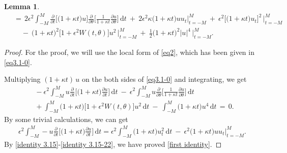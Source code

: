 \documentclass[10pt, reqno]{amsart}
\numberwithin{equation}{section}
\newtheorem{lemma}[theorem]{Lemma}
\theoremstyle{definition}
\begin{document}
{{\begin{lemma}
\begin{align}
 &\,=\,
 2 \epsilon^2\int_{-M}^{M}
 \frac{\partial}{\partial t} \Big[\big(1+\kappa t\big) u \Big]
 \frac{\partial}{\partial\theta} \Big[ \frac{1}{1+\kappa t} \frac{\partial u}{\partial\theta} \Big]\,{\mathrm d}t
 \ +\
 2\epsilon^2 \kappa\big(1+\kappa t\big) u u_t \Bigg|_{t=-M}^{M}
 \ +\
 \epsilon^2\Big[ \big(1+\kappa t\big) u_t \Big]^2\, \Bigg|_{t=-M}^{M}
\nonumber\\[2mm]
 &\quad
 \ -\
 \big(1+\kappa t\big)^2 \big[1+ \epsilon^2 W(t, \theta)\big] u^2\, \Bigg|_{t=-M}^{M}
 \ +\
 \frac{1}{2} \big(1+\kappa t\big)^2 |u|^4\, \Bigg|_{t=-M}^{M}.
 \label{third identity}
\end{align}
\end{lemma}



\begin{proof}
 For the proof, we will use the local form of \eqref{eq2}, which has been given in \eqref{eq3.1-0}.

\smallskip{}
 Multiplying $(1+\kappa t)\, u$ on the both sides of \eqref{eq3.1-0} and integrating, we get
\begin{align} \label{identity 3.15}
 & -\ \epsilon^2\int_{-M}^{M}
 u
 \frac{\partial}{\partial t}
 \Bigg[ \big(1+\kappa t\big) \frac{\partial u}{\partial t} \Bigg] \,{\mathrm d}t
 \ -\
 \epsilon^2\int_{-M}^{M} u
 \frac{\partial}{\partial\theta}
 \Bigg[ \frac{1}{1+\kappa t} \frac{\partial u}{\partial\theta} \Bigg]\,{\mathrm d}t
\nonumber\\[2mm]
 & +\ \int_{-M}^{M} \big({1+\kappa t}\big) \big[1+\epsilon^2 W (t, \theta) \big] u^2\,{\mathrm d}t
 \ -\ \int_{-M}^{M} \big({1+\kappa t}\big) u^4 \,{\mathrm d}t
 \,=\, 0.
\end{align}
 By some trivial calculations, we can get
\begin{align} \label{identity 3.15-22}
 \epsilon^2\int_{-M}^{M}
 -u\frac{\partial}{\partial t} \Big[ \big(1+\kappa t\big) \frac{\partial u}{\partial t} \Big] \,{\mathrm d}t
 =
 \epsilon^2\int_{-M}^{M} \big({1+\kappa t}\big) u_t^2 \,{\mathrm d}t
 \ -\ \epsilon^2\big(1+\kappa t\big)u u_t \Bigg|_{t=-M}^{M}.
\end{align}
 By \eqref{identity 3.15}-\eqref{identity 3.15-22}, we have proved \eqref{first identity}.




\end{proof}}}
\end{document}
